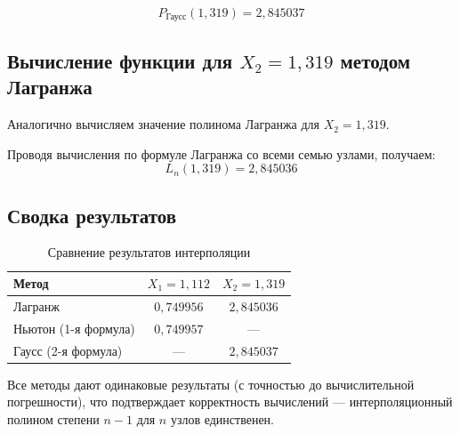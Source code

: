 \[
\boxed{P_{\text{Гаусс}}(1{,}319) = 2{,}845037}
\]

\subsection{Вычисление функции для $X_2 = 1{,}319$ методом Лагранжа}

Аналогично вычисляем значение полинома Лагранжа для $X_2 = 1{,}319$.

Проводя вычисления по формуле Лагранжа со всеми семью узлами, получаем:
\[
\boxed{L_n(1{,}319) = 2{,}845036}
\]

\subsection{Сводка результатов}

\begin{table}[h!]
\centering
\label{tab:results}
\renewcommand{\arraystretch}{1.5}
\begin{tabular}{|l|c|c|}
\hline
\textbf{Метод} & \textbf{$X_1 = 1{,}112$} & \textbf{$X_2 = 1{,}319$} \\
\hline
Лагранж & $0{,}749956$ & $2{,}845036$ \\
Ньютон (1-я формула) & $0{,}749957$ & — \\
Гаусс (2-я формула) & — & $2{,}845037$ \\
\hline
\end{tabular}
\caption{Сравнение результатов интерполяции}
\end{table}

Все методы дают одинаковые результаты (с точностью до вычислительной погрешности), что подтверждает корректность вычислений — интерполяционный полином степени $n-1$ для $n$ узлов единственен.
